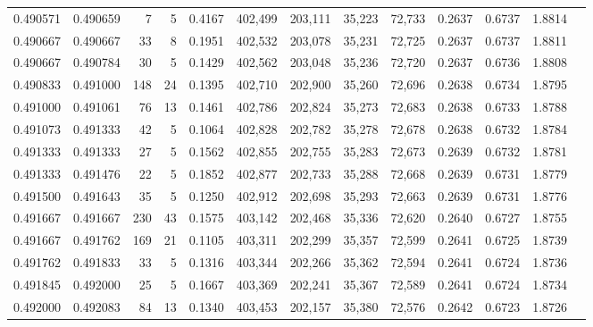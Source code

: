\begin{tabular}{rrrrrrrrrrrrr}
0.490571 & 0.490659 &     7 &   5 &                                     0.4167 & 402,499 & 203,111 &  35,223 &  72,733 & 0.2637 & 0.6737 & 1.8814 \\
0.490667 & 0.490667 &    33 &   8 &                                     0.1951 & 402,532 & 203,078 &  35,231 &  72,725 & 0.2637 & 0.6737 & 1.8811 \\
0.490667 & 0.490784 &    30 &   5 &                                     0.1429 & 402,562 & 203,048 &  35,236 &  72,720 & 0.2637 & 0.6736 & 1.8808 \\
0.490833 & 0.491000 &   148 &  24 &                                     0.1395 & 402,710 & 202,900 &  35,260 &  72,696 & 0.2638 & 0.6734 & 1.8795 \\
0.491000 & 0.491061 &    76 &  13 &                                     0.1461 & 402,786 & 202,824 &  35,273 &  72,683 & 0.2638 & 0.6733 & 1.8788 \\
0.491073 & 0.491333 &    42 &   5 &                                     0.1064 & 402,828 & 202,782 &  35,278 &  72,678 & 0.2638 & 0.6732 & 1.8784 \\
0.491333 & 0.491333 &    27 &   5 &                                     0.1562 & 402,855 & 202,755 &  35,283 &  72,673 & 0.2639 & 0.6732 & 1.8781 \\
0.491333 & 0.491476 &    22 &   5 &                                     0.1852 & 402,877 & 202,733 &  35,288 &  72,668 & 0.2639 & 0.6731 & 1.8779 \\
0.491500 & 0.491643 &    35 &   5 &                                     0.1250 & 402,912 & 202,698 &  35,293 &  72,663 & 0.2639 & 0.6731 & 1.8776 \\
0.491667 & 0.491667 &   230 &  43 &                                     0.1575 & 403,142 & 202,468 &  35,336 &  72,620 & 0.2640 & 0.6727 & 1.8755 \\
0.491667 & 0.491762 &   169 &  21 &                                     0.1105 & 403,311 & 202,299 &  35,357 &  72,599 & 0.2641 & 0.6725 & 1.8739 \\
0.491762 & 0.491833 &    33 &   5 &                                     0.1316 & 403,344 & 202,266 &  35,362 &  72,594 & 0.2641 & 0.6724 & 1.8736 \\
0.491845 & 0.492000 &    25 &   5 &                                     0.1667 & 403,369 & 202,241 &  35,367 &  72,589 & 0.2641 & 0.6724 & 1.8734 \\
0.492000 & 0.492083 &    84 &  13 &                                     0.1340 & 403,453 & 202,157 &  35,380 &  72,576 & 0.2642 & 0.6723 & 1.8726 \\

\end{tabular}
